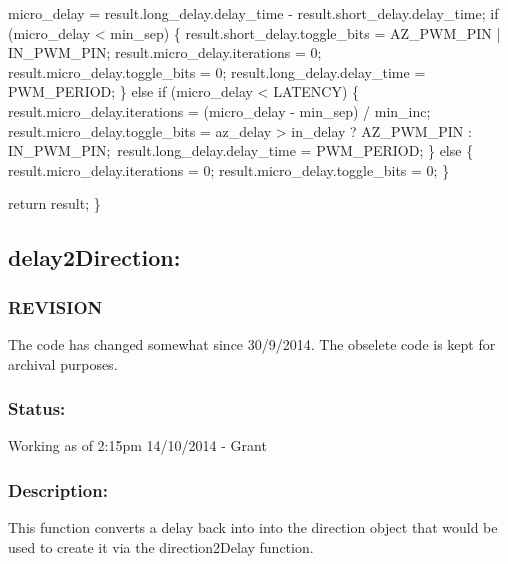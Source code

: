 \documentclass[]{report}
\begin{document}
	micro\_delay = result.long\_delay.delay\_time - result.short\_delay.delay\_time;\newline
	if (micro\_delay < min\_sep)\newline
	\{\newline
		result.short\_delay.toggle\_bits = AZ\_PWM\_PIN | IN\_PWM\_PIN;\newline
		result.micro\_delay.iterations = 0;\newline
		result.micro\_delay.toggle\_bits = 0;\newline
		result.long\_delay.delay\_time = PWM\_PERIOD;\newline
	\}\newline
	else if (micro\_delay < LATENCY)\newline
	\{\newline
		result.micro\_delay.iterations = (micro\_delay - min\_sep) / min\_inc;\newline
		result.micro\_delay.toggle\_bits = az\_delay > in\_delay ? AZ\_PWM\_PIN : IN\_PWM\_PIN;\newline\
		result.long\_delay.delay\_time = PWM\_PERIOD;\newline
	\}\newline
	else\newline
	\{\newline
		result.micro\_delay.iterations = 0;\newline
		result.micro\_delay.toggle\_bits = 0;\newline
	\}\newline
	
	return result;\newline
\}\newline

\subsection{delay2Direction:}
\subsubsection{REVISION}
The code has changed somewhat since 30/9/2014. The obselete code is kept for archival purposes.

\subsubsection{Status:}
Working as of 2:15pm 14/10/2014 - Grant

\subsubsection{Description:}
This function converts a delay back into into the direction object that would be used to create it via the direction2Delay function.
\end{document}
